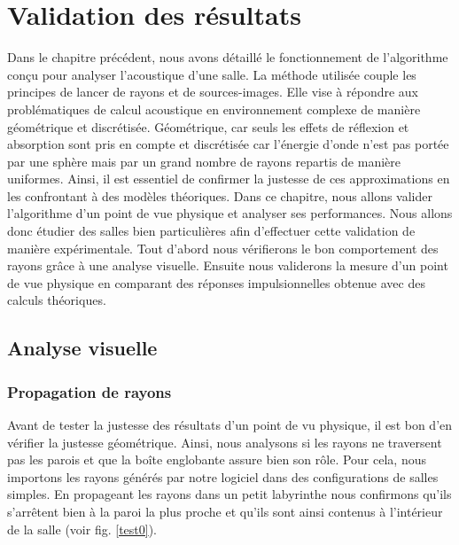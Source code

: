 \chapter{Validation des résultats}
	\minitoc
	\newpage
	

Dans le chapitre précédent, nous avons détaillé le fonctionnement de l'algorithme conçu pour analyser l'acoustique d'une salle. La méthode utilisée couple les principes de lancer de rayons et de sources-images. Elle vise à répondre aux problématiques de calcul acoustique en environnement complexe de manière géométrique et discrétisée. Géométrique, car seuls les effets de réflexion et absorption sont pris en compte et discrétisée car l'énergie d'onde n'est pas portée par une sphère mais par un grand nombre de rayons repartis de manière uniformes. Ainsi, il est essentiel de confirmer la justesse de ces approximations en les confrontant à des modèles théoriques. Dans ce chapitre, nous allons valider l'algorithme d'un point de vue physique et analyser ses performances. Nous allons donc étudier des salles bien particulières afin d'effectuer cette validation de manière expérimentale. Tout d'abord nous vérifierons le bon comportement des rayons grâce à une analyse visuelle. Ensuite nous validerons la mesure d'un point de vue physique en comparant des réponses impulsionnelles obtenue avec des calculs théoriques.

\section{Analyse visuelle}
\subsection{Propagation de rayons}

Avant de tester la justesse des résultats d'un point de vu physique, il est bon d'en vérifier la justesse géométrique. Ainsi, nous analysons si les rayons ne traversent pas les parois et que la boîte englobante assure bien son rôle. Pour cela, nous importons les rayons générés par notre logiciel dans des configurations de salles simples. En propageant les rayons dans un petit labyrinthe nous confirmons qu'ils s'arrêtent bien à la paroi la plus proche et qu'ils sont ainsi contenus à l'intérieur de la salle (voir fig. \ref{test0}). 


